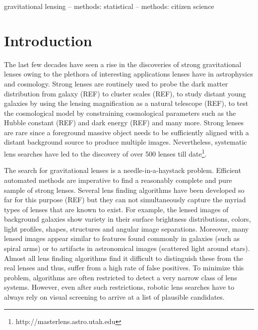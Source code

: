 \documentclass[useAMS,usenatbib,a4paper]{mn2e}
\begin{document}

\begin{keywords}
  gravitational lensing   --
  methods: statistical    --
  methods: citizen science
\end{keywords}

\setcounter{footnote}{1}


\section{Introduction}
\label{sec:intro}


The last few decades have seen a rise in the discoveries of strong
gravitational lenses owing to the plethora of interesting applications
lenses have in astrophysics and cosmology. Strong lenses are routinely
used to probe the dark matter distribution from galaxy (REF) to cluster
scales (REF), to  study distant young galaxies by using the lensing
magnification as a natural telescope (REF), to test the cosmological
model by constraining cosmological parameters such as the Hubble
constant (REF) and dark energy (REF) and many more. Strong
lenses are rare since a foreground massive object needs to be
sufficiently aligned with a distant background source to produce
multiple images. Nevertheless, systematic lens searches have led to the
discovery of over 500 lenses till
date\footnote{http://masterlens.astro.utah.edu}.

The search for gravitational lenses is a needle-in-a-haystack problem.
Efficient automated methods are imperative to find a reasonably complete and
pure sample of strong lenses. Several lens finding algorithms have been
developed so far for this purpose (REF) but they can not simultaneously capture
the myriad types of lenses that are known to exist.  For example, the lensed
images of background galaxies show variety in their surface brightness
distributions, colors, light profiles, shapes, structures and angular image
separations.  Moreover, many lensed images appear similar to features found
commonly in galaxies (such as spiral arms) or to artifacts in astronomical
images (scattered light around stars).  Almost all lens finding algorithms find
it difficult to distinguish these from the real lenses and thus, suffer from a
high rate of false positives.  To minimize this problem, algorithms are often
restricted to detect a very narrow class of lens systems. However, even after
such restrictions, robotic lens searches have to always rely on visual screening
to arrive at a list of plausible candidates.
\end{document}
